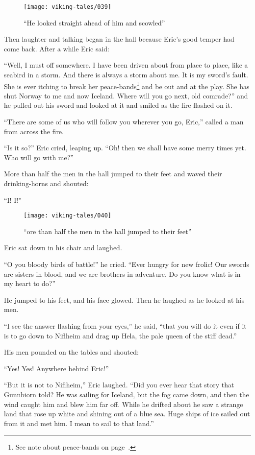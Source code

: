\begin{figure}
    \centering
    \texttt{[image: viking-tales/039]}
    \caption{``He looked straight ahead of him and scowled''}
\end{figure}

Then laughter and talking began in the hall because Eric's good temper
had come back. After a while Eric said:

``Well, I must off somewhere. I have been driven about from place to
place, like a seabird in a storm. And there is always a storm about me.
It is my sword's fault. She is ever itching to break her
peace-bands\footnote{See note about peace-bands on
page~\pageref{peace-bands}.} and be out and at the play. She has shut
Norway to me and now Iceland. Where will you go next, old comrade?'' and
he pulled out his sword and looked at it and smiled as the fire flashed
on it.

``There are some of us who will follow you wherever you go, Eric,''
called a man from across the fire.

``Is it so?'' Eric cried, leaping up. ``Oh! then we shall have some
merry times yet. Who will go with me?''

More than half the men in the hall jumped to their feet and waved their
drinking-horns and shouted:

``I! I!''

\begin{figure}
    \centering
    \texttt{[image: viking-tales/040]}
    \caption{``ore than half the men in the hall jumped to their feet''}
\end{figure}

Eric sat down in his chair and laughed.

``O you bloody birds of battle!'' he cried. ``Ever hungry for new
frolic! Our swords are sisters in blood, and we are brothers in
adventure. Do you know what is in my heart to do?''

He jumped to his feet, and his face glowed. Then he laughed as he looked
at his men.

``I see the answer flashing from your eyes,'' he said, ``that you will
do it even if it is to go down to Niflheim and drag up Hela, the pale
queen of the stiff dead.''

His men pounded on the tables and shouted:

``Yes! Yes! Anywhere behind Eric!''

``But it is not to Niflheim,'' Eric laughed. ``Did you ever hear that
story that Gunnbiorn told? He was sailing for Iceland, but the fog came
down, and then the wind caught him and blew him far off. While he
drifted about he saw a strange land that rose up white and shining out
of a blue sea. Huge ships of ice sailed out from it and met him. I mean
to sail to that land.''

